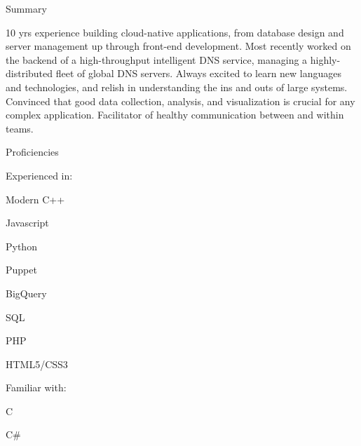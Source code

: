 \documentclass[letterpaper,12pt]{article}
\begin{document}
\begin{paracol}{2}
\rmfamily
\begin{res_section}{Summary}
  \noindent
  \begin{minipage}{\columnwidth}
  10 yrs experience building cloud-native applications, from database design and server management up through front-end development.
  Most recently worked on the backend of a high-throughput intelligent DNS service, managing a highly-distributed fleet of
  global DNS servers. Always excited to learn new languages and technologies, and relish in understanding the ins and outs of large systems.
  Convinced that good data collection, analysis, and visualization is crucial for any complex application. Facilitator of healthy communication
  between and within teams.
  \end{minipage}
\end{res_section}
\begin{res_section}{Proficiencies}
\begin{res_subsection}{Experienced in:}
  \rmfamily
   \item Modern C++
   \item Javascript
   \item Python
   \item Puppet
   \item BigQuery
   \item SQL
   \item PHP
   \item HTML5/CSS3
\end{res_subsection}
\begin{res_subsection}{Familiar with:}
   \item C
   \item C\#

\end{res_subsection}
\end{res_section}
\end{paracol}
\end{document}
